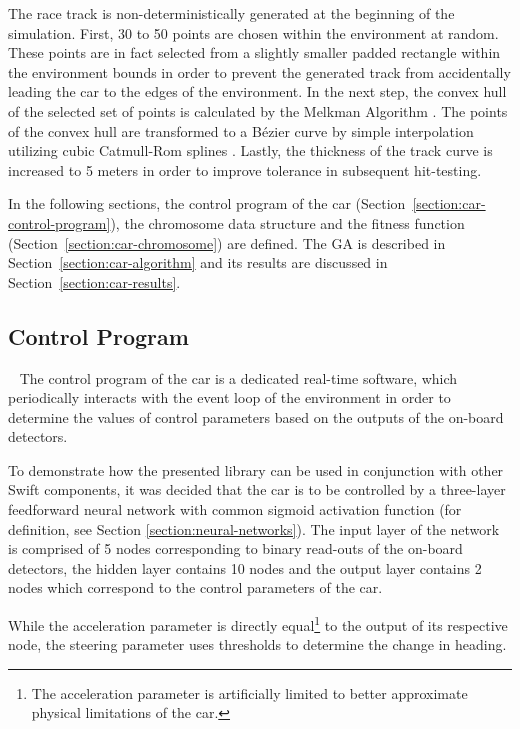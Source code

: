 The race track is non-deterministically generated at the beginning of the simulation. First, 30 to 50 points are chosen within the environment at random. These points are in fact selected from a slightly smaller padded rectangle within the environment bounds in order to prevent the generated track from accidentally leading the car to the edges of the environment. In the next step, the convex hull of the selected set of points is calculated by the Melkman Algorithm \cite{MelkmanConvexHull}. The points of the convex hull are transformed to a Bézier curve by simple interpolation utilizing cubic Catmull-Rom splines \cite{CatmullRomSplines}. Lastly, the thickness of the track curve is increased to 5 meters in order to improve tolerance in subsequent hit-testing.

In the following sections, the control program of the car (Section~\ref{section:car-control-program}), the chromosome data structure and the fitness function (Section~\ref{section:car-chromosome}) are defined. The GA is described in Section~\ref{section:car-algorithm} and its results are discussed in Section~\ref{section:car-results}.

\subsection{Control Program}~\label{section:car-control-program}
The control program of the car is a dedicated real-time software, which periodically interacts with the event loop of the environment in order to determine the values of control parameters based on the outputs of the on-board detectors.

To demonstrate how the presented library can be used in conjunction with other Swift components, it was decided that the car is to be controlled by a three-layer feedforward neural network with common sigmoid activation function (for definition, see Section \ref{section:neural-networks}). The input layer of the network is comprised of 5 nodes corresponding to binary read-outs of the on-board detectors, the hidden layer contains 10 nodes and the output layer contains 2 nodes which correspond to the control parameters of the car.

While the acceleration parameter is directly equal\footnote{The acceleration parameter is artificially limited to better approximate physical limitations of the car.} to the output of its respective node, the steering parameter uses thresholds to determine the change in heading.

